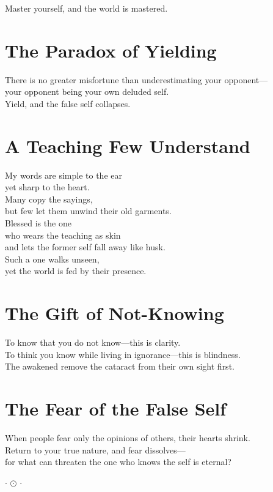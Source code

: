 \documentclass[10pt, openright]{book}
\newcommand{\ornament}{
    \vspace{1.5cm}
    \begin{center}
        \large $\cdot$ $\odot$ $\cdot$
    \end{center}
    \vspace{1.5cm}
}
\begin{document}
Master yourself, and the world is mastered.

\section{The Paradox of Yielding}
There is no greater misfortune than underestimating your opponent— \\
your opponent being your own deluded self. \\
Yield, and the false self collapses.

\section{A Teaching Few Understand}
My words are simple to the ear \\
yet sharp to the heart. \\
Many copy the sayings, \\
but few let them unwind their old garments. \\

Blessed is the one \\
who wears the teaching as skin \\
and lets the former self fall away like husk. \\
Such a one walks unseen, \\
yet the world is fed by their presence.

\section{The Gift of Not-Knowing}
To know that you do not know—this is clarity. \\
To think you know while living in ignorance—this is blindness. \\
The awakened remove the cataract from their own sight first.

\section{The Fear of the False Self}
When people fear only the opinions of others, their hearts shrink. \\
Return to your true nature, and fear dissolves— \\
for what can threaten the one who knows the self is eternal?

\ornament

\end{document}
